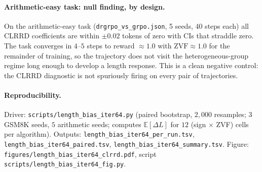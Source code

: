\paragraph{Arithmetic-easy task: null finding, by design.}
On the arithmetic-easy task (\texttt{drgrpo\_vs\_grpo.json}, 5 seeds,
40 steps each) all CLRRD coefficients are within $\pm 0.02$ tokens of
zero with CIs that straddle zero. The task converges in $4$--$5$ steps
to reward $\approx 1.0$ with $\mathrm{ZVF} \approx 1.0$ for the
remainder of training, so the trajectory does not visit the
heterogeneous-group regime long enough to develop a length response.
This is a clean negative control: the CLRRD diagnostic is not
spuriously firing on every pair of trajectories.

\paragraph{Reproducibility.}
Driver: \texttt{scripts/length\_bias\_iter64.py} (paired bootstrap,
$2{,}000$ resamples; $3$ GSM8K seeds, $5$ arithmetic seeds; computes
$\mathbb{E}[\Delta L]$ for $12$ (sign $\times$ ZVF) cells per
algorithm). Outputs: \texttt{length\_bias\_iter64\_per\_run.tsv},
\texttt{length\_bias\_iter64\_paired.tsv},
\texttt{length\_bias\_iter64\_summary.tsv}. Figure:
\texttt{figures/length\_bias\_iter64\_clrrd.pdf}, script
\texttt{scripts/length\_bias\_iter64\_fig.py}.